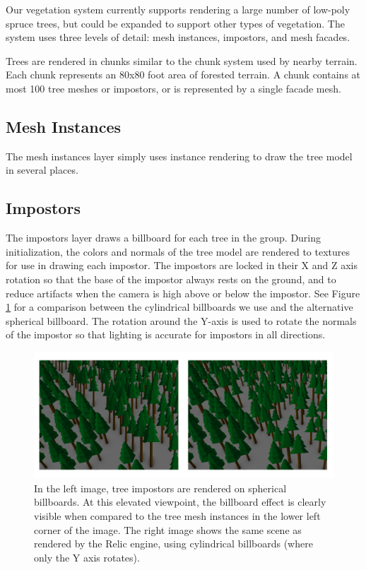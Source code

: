 Our vegetation system currently supports rendering a large number of low-poly spruce trees, but could be expanded to support other types of vegetation.
The system uses three levels of detail: mesh instances, impostors, and mesh facades.

Trees are rendered in chunks similar to the chunk system used by nearby terrain.
Each chunk represents an 80x80 foot area of forested terrain.
A chunk contains at most 100 tree meshes or impostors, or is represented by a single facade mesh.

\subsection{Mesh Instances}

The mesh instances layer simply uses instance rendering to draw the tree model in several places.

\subsection{Impostors}

The impostors layer draws a billboard for each tree in the group.
During initialization, the colors and normals of the tree model are rendered to textures for use in drawing each impostor.
The impostors are locked in their X and Z axis rotation so that the base of the impostor always rests on the ground, and to reduce artifacts when the camera is high above or below the impostor.
See Figure \ref{fig:tree_billboards} for a comparison between the cylindrical billboards we use and the alternative spherical billboard.
The rotation around the Y-axis is used to rotate the normals of the impostor so that lighting is accurate for impostors in all directions.

\begin{figure}
	\centering
		\includegraphics[width=1.0\textwidth]{figures/tree_billboards.jpg}
	\caption{
		In the left image, tree impostors are rendered on spherical billboards.
		At this elevated viewpoint, the billboard effect is clearly visible when compared to the tree mesh instances in the lower left corner of the image.
		The right image shows the same scene as rendered by the Relic engine, using cylindrical billboards (where only the Y axis rotates).
	}
	\label{fig:tree_billboards}
\end{figure}

